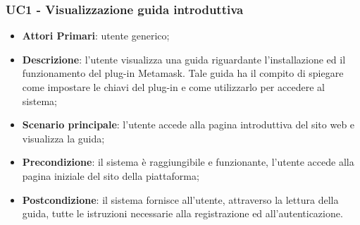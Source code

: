 
\subsubsection{UC1 - Visualizzazione guida introduttiva}
\begin{itemize}
	\item \textbf{Attori Primari}: utente generico;
	\item \textbf{Descrizione}: l'utente visualizza una guida riguardante l'installazione ed il funzionamento del plug-in Metamask\glo. Tale guida ha il compito di spiegare come impostare le chiavi del plug-in e come utilizzarlo per accedere al sistema;
	\item \textbf{Scenario principale}: l'utente accede alla pagina introduttiva del sito web e visualizza la guida;
	\item \textbf{Precondizione}: il sistema è raggiungibile e funzionante, l'utente accede alla pagina iniziale del sito della piattaforma;
	\item \textbf{Postcondizione}: il sistema fornisce all'utente, attraverso la lettura della guida, tutte le istruzioni necessarie alla registrazione ed all'autenticazione.
	
	
\end{itemize}
